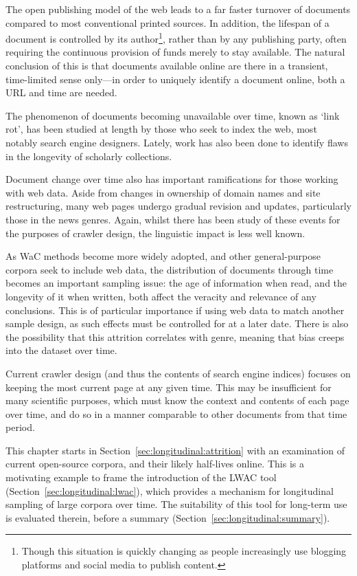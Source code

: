 The open publishing model of the web leads to a far faster turnover of documents compared to most conventional printed sources.  In addition, the lifespan of a document is controlled by its author\footnote{Though this situation is quickly changing as people increasingly use blogging platforms and social media to publish content.}, rather than by any publishing party, often requiring the continuous provision of funds merely to stay available.  The natural conclusion of this is that documents available online are there in a transient, time-limited sense only---in order to uniquely identify a document online, both a URL and time are needed.

The phenomenon of documents becoming unavailable over time, known as `link rot', has been studied at length by those who seek to index the web, most notably search engine designers.  Lately, work has also been done to identify flaws in the longevity of scholarly collections\cite{101371journalpone0115253}.

Document change over time also has important ramifications for those working with web data.  Aside from changes in ownership of domain names and site restructuring, many web pages undergo gradual revision and updates, particularly those in the news genres.  Again, whilst there has been study of these events for the purposes of crawler design, the linguistic impact is less well known.

As WaC methods become more widely adopted, and other general-purpose corpora seek to include web data, the distribution of documents through time becomes an important sampling issue: the age of information when read, and the longevity of it when written, both affect the veracity and relevance of any conclusions.  This is of particular importance if using web data to match another sample design, as such effects must be controlled for at a later date.
There is also the possibility that this attrition correlates with genre, meaning that bias creeps into the dataset over time.

Current crawler design (and thus the contents of search engine indices) focuses on keeping the most current page at any given time.  This may be insufficient for many scientific purposes, which must know the context and contents of each page over time, and do so in a manner comparable to other documents from that time period.

This chapter starts in Section~\ref{sec:longitudinal:attrition} with an examination of current open-source corpora, and their likely half-lives online.  This is a motivating example to frame the introduction of the LWAC tool (Section~\ref{sec:longitudinal:lwac}), which provides a mechanism for longitudinal sampling of large corpora over time.  The suitability of this tool for long-term use is evaluated therein, before a summary (Section~\ref{sec:longitudinal:summary}).


